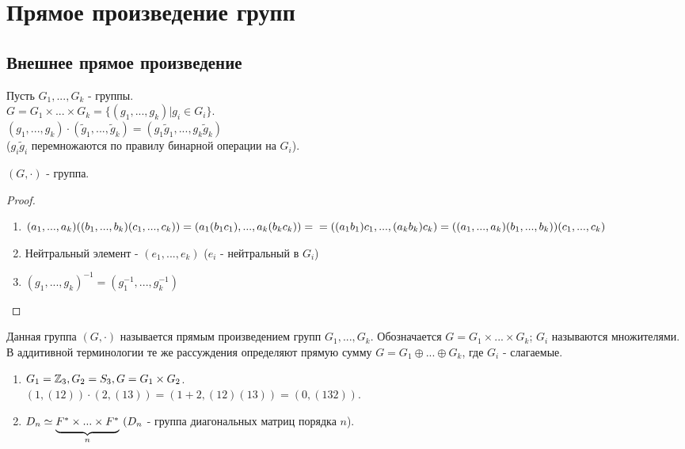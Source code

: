 \section{Прямое произведение групп}
\subsection{Внешнее прямое произведение}
    Пусть $G_1,...,G_k$ - группы.\\
    $G = G_1 \times ... \times G_k = \{(g_1,...,g_k)| g_i \in G_i\}$.\\
    $(g_1,...,g_k)\cdot(\tilde{g}_1,...,\tilde{g}_k) = (g_1\tilde{g}_1,...,g_k\tilde{g}_k)$\\
    ($g_i\tilde{g}_i$ перемножаются по правилу бинарной операции на $G_i$).
\begin{subtheorem}
    $(G, \cdot)$ - группа.
\end{subtheorem}
\begin{proof}\tab
    \begin{enumerate}
        \item $(a_1,...,a_k)((b_1,...,b_k)(c_1,...,c_k)) = (a_1(b_1c_1),...,a_k(b_kc_k)) =\\= ((a_1b_1)c_1,...,(a_kb_k)c_k) = ((a_1,...,a_k)(b_1,...,b_k))(c_1,...,c_k)$ 
        \item Нейтральный элемент - $(e_1,...,e_k)$ ($e_i$ - нейтральный в $G_i$)
        \item $(g_1,...,g_k)^{-1} = (g_1^{-1},...,g_k^{-1})$ 
    \end{enumerate}
\end{proof}
\begin{definition}
    Данная группа $(G, \cdot)$ называется прямым произведением групп $G_1,...,G_k$. Обозначается $G = G_1 \times ... \times G_k$; $G_i$ называются множителями.\\
    В аддитивной терминологии те же рассуждения определяют прямую сумму $G = G_1 \oplus ... \oplus G_k$, где $G_i$ - слагаемые.
\end{definition}
\begin{examples}\tab
    \begin{enumerate}
        \item $G_1 = \mathbb{Z}_3, G_2 = S_3, G = G_1 \times G_2$.\\
        $(1, (12))\cdot (2, (13)) = (1+2, (12)(13)) = (0, (132))$.
        \item $D_n \simeq \undermat{n}{F^* \times ... \times F^*} \ (D_n$ - группа диагональных матриц порядка $n$). 
    \end{enumerate}
\end{examples}
